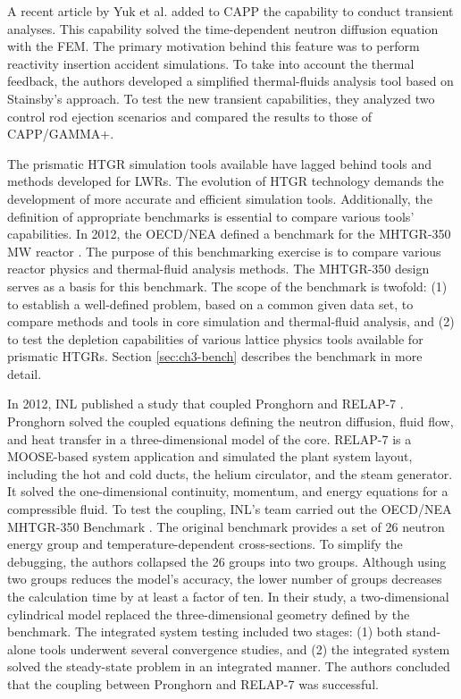 A recent article by Yuk et al. \cite{yuk_time-dependent_2020} added to CAPP the capability to conduct transient analyses.
This capability solved the time-dependent neutron diffusion equation with the \gls{FEM}.
The primary motivation behind this feature was to perform reactivity insertion accident simulations.
To take into account the thermal feedback, the authors developed a simplified thermal-fluids analysis tool based on Stainsby's approach.
To test the new transient capabilities, they analyzed two control rod ejection scenarios and compared the results to those of CAPP/GAMMA+.

The prismatic HTGR simulation tools available have lagged behind tools and methods developed for \glspl{LWR}.
The evolution of HTGR technology demands the development of more accurate and efficient simulation tools.
Additionally, the definition of appropriate benchmarks is essential to compare various tools' capabilities.
In 2012, the \gls{OECD}/\gls{NEA} defined a benchmark for the \gls{MHTGR}-350 MW reactor \cite{oecd_nea_benchmark_2017}.
The purpose of this benchmarking exercise is to compare various reactor physics and thermal-fluid analysis methods.
The MHTGR-350 design serves as a basis for this benchmark.
The scope of the benchmark is twofold: (1) to establish a well-defined problem, based on a common given data set, to compare methods and tools in core simulation and thermal-fluid analysis, and (2) to test the depletion capabilities of various lattice physics tools available for prismatic HTGRs.
Section \ref{sec:ch3-bench} describes the benchmark in more detail.

In 2012, \gls{INL} published a study \cite{j_ortensi_initial_2012} that coupled Pronghorn and RELAP-7 \cite{andrs_relap-7_2012}.
Pronghorn solved the coupled equations defining the neutron diffusion, fluid flow, and heat transfer in a three-dimensional model of the core.
RELAP-7 is a MOOSE-based system application and simulated the plant system layout, including the hot and cold ducts, the helium circulator, and the steam generator.
It solved the one-dimensional continuity, momentum, and energy equations for a compressible fluid.
To test the coupling, INL's team carried out the OECD/NEA MHTGR-350 Benchmark \cite{oecd_nea_coupled_2020}.
The original benchmark provides a set of 26 neutron energy group and temperature-dependent cross-sections.
To simplify the debugging, the authors collapsed the 26 groups into two groups.
Although using two groups reduces the model's accuracy, the lower number of groups decreases the calculation time by at least a factor of ten.
In their study, a two-dimensional cylindrical model replaced the three-dimensional geometry defined by the benchmark.
The integrated system testing included two stages: (1) both stand-alone tools underwent several convergence studies, and (2) the integrated system solved the steady-state problem in an integrated manner.
The authors concluded that the coupling between Pronghorn and RELAP-7 was successful.

